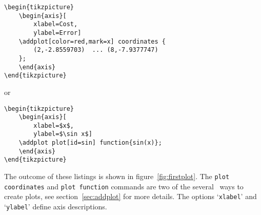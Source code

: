 \begin{lstlisting}
\begin{tikzpicture}
	\begin{axis}[
		xlabel=Cost,
		ylabel=Error]
	\addplot[color=red,mark=x] coordinates {
		(2,-2.8559703)	...	(8,-7.9377747)
	};
	\end{axis}
\end{tikzpicture}
\end{lstlisting}
or
\begin{lstlisting}
\begin{tikzpicture}
	\begin{axis}[
		xlabel=$x$,
		ylabel=$\sin x$]
	\addplot plot[id=sin] function{sin(x)};
	\end{axis}
\end{tikzpicture}
\end{lstlisting}
The outcome of these listings is shown in figure~\ref{fig:firstplot}. The \lstinline!plot coordinates! and \lstinline!plot function! commands are two of the several \Tikz\ ways to create plots, see section~\ref{sec:addplot} for more details. The options `\texttt{xlabel}' and `\texttt{ylabel}' define axis descriptions.

